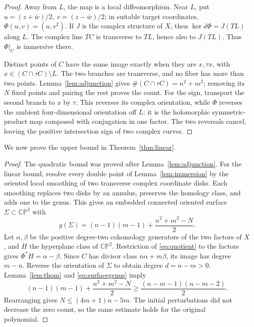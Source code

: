 \documentclass[a4paper]{amsart}
\theoremstyle{remark}
\newcommand{\CP}{\mathbb {CP}}
\begin{document}
\begin{proof}
Away from \(L\), the map is a local diffeomorphism.
Near \(L\), put \(u=(z+\bar w)/2,\ v=(z-\bar w)/2\);
in suitable target coordinates, \(\Phi(u,v)=(u,v^2)\).
If \(J\) is the complex structure of \(X\), then
\(\ker d\Phi=J(TL)\) along \(L\).
The complex line \(TC\) is transverse to \(TL\), hence also
to \(J(TL)\). Thus \(\Phi|_C\) is immersive there.

Distinct points of \(C\) have the same image exactly when
they are \(x,\tau x\), with \(x\in(C\cap\tau C)\setminus L\).
The two branches are transverse, and no fiber has more
than two points. Lemma~\ref{lem:adjunction} gives
\(\#(C\cap\tau C)=n^2+m^2\); removing its \(N\) fixed
points and pairing the rest proves the count.
For the sign, transport the second branch to \(x\) by
\(\tau\). This reverses its complex orientation,
while \(\Phi\) reverses the ambient four-dimensional
orientation off \(L\): it is the holomorphic symmetric-product
map composed with conjugation in one factor.
The two reversals cancel, leaving
the positive intersection sign of two complex curves.
\end{proof}

We now prove the upper bound in Theorem~\ref{thm:linear}.

\begin{proof}
The quadratic bound was proved after Lemma~\ref{lem:adjunction}.
For the linear bound, resolve every double point of
Lemma~\ref{lem:immersion} by the oriented local smoothing
of two transverse complex coordinate disks. Each smoothing
replaces two disks by an annulus, preserves the homology
class, and adds one to the genus.
This gives an embedded connected oriented surface
\(\Sigma\subset\CP^2\) with
\begin{equation}\label{eq:surfacegenus}
 g(\Sigma)=(n-1)(m-1)+\frac{n^2+m^2-N}{2}.
\end{equation}
Let \(\alpha,\beta\) be the positive degree-two cohomology
generators of the two factors of \(X\), and \(H\) the
hyperplane class of \(\CP^2\).
Restriction of \eqref{eq:quotient} to the factors gives
\(\Phi^*H=\alpha-\beta\).
Since \(C\) has divisor class \(n\alpha+m\beta\), its image
has degree \(m-n\). Reverse the orientation of \(\Sigma\)
to obtain degree \(d=n-m>0\).
Lemma~\ref{lem:thom} and \eqref{eq:surfacegenus} imply
\[
 (n-1)(m-1)+\frac{n^2+m^2-N}{2}
 \ge\frac{(n-m-1)(n-m-2)}2.
\]
Rearranging gives \(N\le(4m+1)n-5m\).
The initial perturbations did not decrease the zero count,
so the same estimate holds for the original polynomial.
\end{proof}
\end{document}
